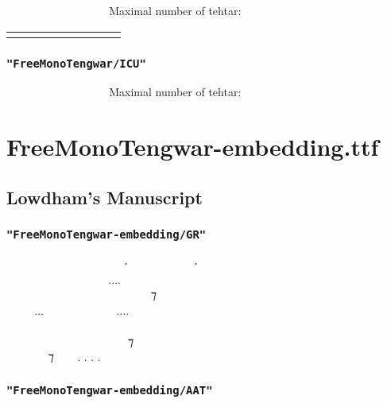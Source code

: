 \documentclass{article}
\begin{document}
\insertAAT      \normalfont Maximal number of tehtar:
\insertAAT  

\begin{tabular}{ c | c c c c c c c c}
	\combinationsrow{} \hline
	\combinationsrow{}
	\combinationsrow{}
	\combinationsrow{}
	\combinationsrow{}
	\combinationsrow{}
	\combinationsrow{}
	\combinationsrow{}
	\combinationsrow{}
\end{tabular}

\subsubsection*{\texttt{"FreeMonoTengwar/ICU"}}

\freeICU      \normalfont Maximal number of tehtar:
\freeICU  


\newpage

\section{FreeMonoTengwar-embedding.ttf}

\subsection{Lowdham’s Manuscript}

\subsubsection*{\texttt{"FreeMonoTengwar-embedding/GR"}}

\embedGR
  ‍   ⸱‍  ‍ ⸱ \\
    ‍....  ‍  \\
  ‍   ‍ ‍ ⁊ ‍  \\
...  ....   \\
         ‍ \\
 ‍ ‍‍   ⁊  ‍ ‍ \\
 ‍ ⁊  . . . . \normalfont

\subsubsection*{\texttt{"FreeMonoTengwar-embedding/AAT"}}
\end{document}
